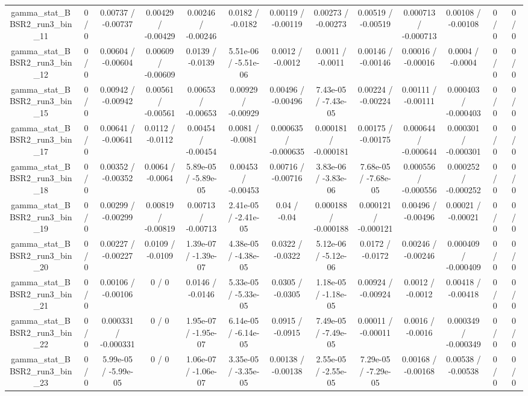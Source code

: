 \documentclass[10pt]{article}
\begin{document}
\begin{table}[htbp]
\begin{center}
\begin{tabular}{|c|c|c|c|c|c|c|c|c|c|c|c|c|}
  gamma_stat_BBSR2_run3_bin_11 & 0 / 0 & 0.00737 / -0.00737 & 0.00429 / -0.00429 & 0.00246 / -0.00246 & 0.0182 / -0.0182 & 0.00119 / -0.00119 & 0.00273 / -0.00273 & 0.00519 / -0.00519 & 0.000713 / -0.000713 & 0.00108 / -0.00108 & 0 / 0 & 0 / 0 \\ 
  gamma_stat_BBSR2_run3_bin_12 & 0 / 0 & 0.00604 / -0.00604 & 0.00609 / -0.00609 & 0.0139 / -0.0139 & 5.51e-06 / -5.51e-06 & 0.0012 / -0.0012 & 0.0011 / -0.0011 & 0.00146 / -0.00146 & 0.00016 / -0.00016 & 0.0004 / -0.0004 & 0 / 0 & 0 / 0 \\ 
  gamma_stat_BBSR2_run3_bin_15 & 0 / 0 & 0.00942 / -0.00942 & 0.00561 / -0.00561 & 0.00653 / -0.00653 & 0.00929 / -0.00929 & 0.00496 / -0.00496 & 7.43e-05 / -7.43e-05 & 0.00224 / -0.00224 & 0.00111 / -0.00111 & 0.000403 / -0.000403 & 0 / 0 & 0 / 0 \\ 
  gamma_stat_BBSR2_run3_bin_17 & 0 / 0 & 0.00641 / -0.00641 & 0.0112 / -0.0112 & 0.00454 / -0.00454 & 0.0081 / -0.0081 & 0.000635 / -0.000635 & 0.000181 / -0.000181 & 0.00175 / -0.00175 & 0.000644 / -0.000644 & 0.000301 / -0.000301 & 0 / 0 & 0 / 0 \\ 
  gamma_stat_BBSR2_run3_bin_18 & 0 / 0 & 0.00352 / -0.00352 & 0.0064 / -0.0064 & 5.89e-05 / -5.89e-05 & 0.00453 / -0.00453 & 0.00716 / -0.00716 & 3.83e-06 / -3.83e-06 & 7.68e-05 / -7.68e-05 & 0.000556 / -0.000556 & 0.000252 / -0.000252 & 0 / 0 & 0 / 0 \\ 
  gamma_stat_BBSR2_run3_bin_19 & 0 / 0 & 0.00299 / -0.00299 & 0.00819 / -0.00819 & 0.00713 / -0.00713 & 2.41e-05 / -2.41e-05 & 0.04 / -0.04 & 0.000188 / -0.000188 & 0.000121 / -0.000121 & 0.00496 / -0.00496 & 0.00021 / -0.00021 & 0 / 0 & 0 / 0 \\ 
  gamma_stat_BBSR2_run3_bin_20 & 0 / 0 & 0.00227 / -0.00227 & 0.0109 / -0.0109 & 1.39e-07 / -1.39e-07 & 4.38e-05 / -4.38e-05 & 0.0322 / -0.0322 & 5.12e-06 / -5.12e-06 & 0.0172 / -0.0172 & 0.00246 / -0.00246 & 0.000409 / -0.000409 & 0 / 0 & 0 / 0 \\ 
  gamma_stat_BBSR2_run3_bin_21 & 0 / 0 & 0.00106 / -0.00106 & 0 / 0 & 0.0146 / -0.0146 & 5.33e-05 / -5.33e-05 & 0.0305 / -0.0305 & 1.18e-05 / -1.18e-05 & 0.00924 / -0.00924 & 0.0012 / -0.0012 & 0.00418 / -0.00418 & 0 / 0 & 0 / 0 \\ 
  gamma_stat_BBSR2_run3_bin_22 & 0 / 0 & 0.000331 / -0.000331 & 0 / 0 & 1.95e-07 / -1.95e-07 & 6.14e-05 / -6.14e-05 & 0.0915 / -0.0915 & 7.49e-05 / -7.49e-05 & 0.00011 / -0.00011 & 0.0016 / -0.0016 & 0.000349 / -0.000349 & 0 / 0 & 0 / 0 \\ 
  gamma_stat_BBSR2_run3_bin_23 & 0 / 0 & 5.99e-05 / -5.99e-05 & 0 / 0 & 1.06e-07 / -1.06e-07 & 3.35e-05 / -3.35e-05 & 0.00138 / -0.00138 & 2.55e-05 / -2.55e-05 & 7.29e-05 / -7.29e-05 & 0.00168 / -0.00168 & 0.00538 / -0.00538 & 0 / 0 & 0 / 0 \\ 

\end{tabular}
\end{center}
\end{table}
\end{document}
